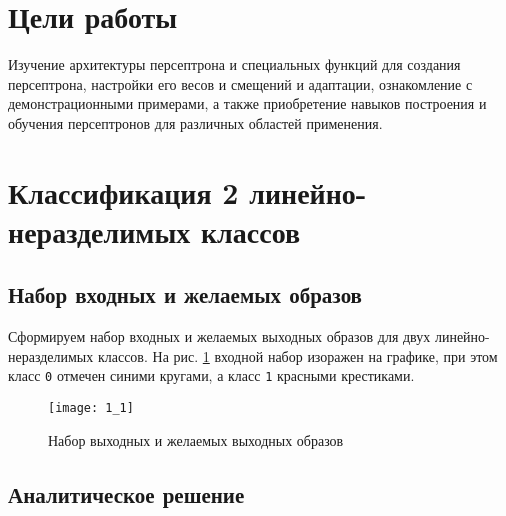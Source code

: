 





\tableofcontents
\listoffigures
\newpage

\section{Цели работы}

Изучение архитектуры персептрона и специальных функций для создания персептрона, настройки его весов и смещений и адаптации, ознакомление с демонстрационными примерами, а так­же приобретение навыков построения и обучения персептронов для различных областей применения.

\section{Классификация 2 линейно-неразделимых классов}

\subsection{Набор входных и желаемых образов}


Сформируем набор входных и желаемых выходных образов для двух линейно-неразделимых классов. На рис. \ref{fig:1_1} входной набор изоражен на графике, при этом класс \verb+0+ отмечен синими кругами, а класс \verb+1+ красными крестиками.

\begin{figure}[H]
\begin{center}
	\texttt{[image: 1\_1]}
	\caption{Набор выходных и желаемых выходных образов}
	\label{fig:1_1}
\end{center}
\end{figure}

\subsection{Аналитическое решение}


